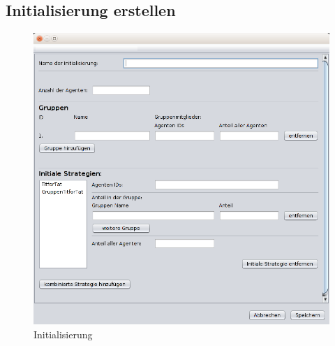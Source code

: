 \pagebreak

\subsection{Initialisierung erstellen}

\begin{figure}[!hp] 
  \centering
     \includegraphics[width=1.1\textwidth]{GUI_Entwurf/NeueInitialisierung.png}
  \caption{Initialisierung}
  \label{fig:Bild1}
\end{figure}


